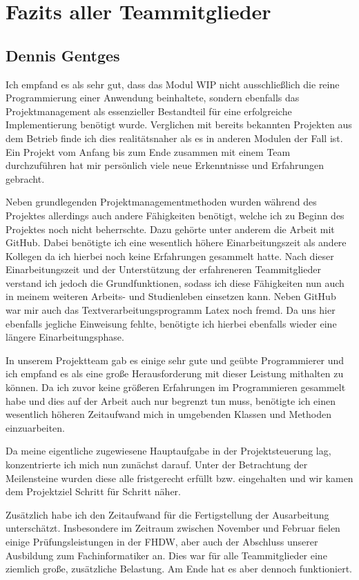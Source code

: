 \section{Fazits aller Teammitglieder}

\subsection{Dennis Gentges}
Ich empfand es als sehr gut, dass das Modul WIP nicht ausschließlich die reine Programmierung einer Anwendung beinhaltete, sondern ebenfalls das Projektmanagement als essenzieller Bestandteil für eine erfolgreiche Implementierung benötigt wurde. Verglichen mit bereits bekannten Projekten aus dem Betrieb finde ich dies realitätsnaher als es in anderen Modulen der Fall ist. Ein Projekt vom Anfang bis zum Ende zusammen mit einem Team durchzuführen hat mir persönlich viele neue Erkenntnisse und Erfahrungen gebracht.

Neben grundlegenden Projektmanagementmethoden wurden während des Projektes allerdings auch andere Fähigkeiten benötigt, welche ich zu Beginn des Projektes noch nicht beherrschte. Dazu gehörte unter anderem die Arbeit mit GitHub. Dabei benötigte ich eine wesentlich höhere Einarbeitungszeit als andere Kollegen da ich hierbei noch keine Erfahrungen gesammelt hatte. Nach dieser Einarbeitungszeit und der Unterstützung der erfahreneren Teammitglieder verstand ich jedoch die Grundfunktionen, sodass ich diese Fähigkeiten nun auch in meinem weiteren Arbeits- und Studienleben einsetzen kann. 
Neben GitHub war mir auch das Textverarbeitungsprogramm Latex noch fremd. Da uns hier ebenfalls jegliche Einweisung fehlte, benötigte ich hierbei ebenfalls wieder eine längere Einarbeitungsphase.

In unserem Projektteam gab es einige sehr gute und geübte Programmierer und ich empfand es als eine große Herausforderung mit dieser Leistung mithalten zu können. Da ich zuvor keine größeren Erfahrungen im Programmieren gesammelt habe und dies auf der Arbeit auch nur begrenzt tun muss, benötigte ich einen wesentlich höheren Zeitaufwand mich in umgebenden Klassen und Methoden einzuarbeiten.

Da meine eigentliche zugewiesene Hauptaufgabe in der Projektsteuerung lag, konzentrierte ich mich nun zunächst darauf. Unter der Betrachtung der Meilensteine wurden diese alle fristgerecht erfüllt bzw. eingehalten und wir kamen dem Projektziel Schritt für Schritt näher.

Zusätzlich habe ich den Zeitaufwand für die Fertigstellung der Ausarbeitung unterschätzt. Insbesondere im Zeitraum zwischen November und Februar fielen einige Prüfungsleistungen in der FHDW, aber auch der Abschluss unserer Ausbildung zum Fachinformatiker an. Dies war für alle Teammitglieder eine ziemlich große, zusätzliche Belastung. Am Ende hat es aber dennoch funktioniert.

